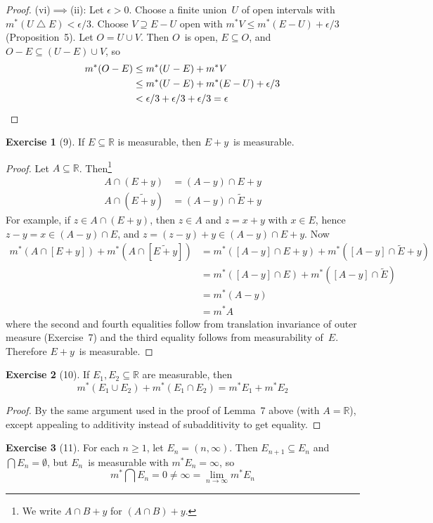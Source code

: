 \documentclass[letterpaper,12pt]{article}
\newcommand{\R}{\mathbb{R}}
\newcommand{\union}{\cup}
\newcommand{\sect}{\cap}
\newcommand{\diff}{\bigtriangleup}
\newcommand{\bigsect}{\bigcap}
\newcommand{\mo}{m^*}
\newcommand{\comp}[1]{\widetilde{#1}}
\theoremstyle{plain}
\theoremstyle{definition}
\newtheorem*{exer}{Exercise}
\theoremstyle{remark}
\begin{document}
\begin{proof}
(vi)\(\implies\)(ii): Let \(\epsilon>0\). Choose a finite union~\(U\) of open intervals with \(\mo(U\diff E)<\epsilon/3\). Choose \(V\supseteq E-U\) open with \(\mo V\le\mo(E-U)+\epsilon/3\) (Proposition~5). Let \(O=U\union V\). Then \(O\)~is open, \(E\subseteq O\), and \(O-E\subseteq(U-E)\union V\), so
\begin{align*}
\mo(O-E)&\le\mo(U-E)+\mo V\\
	&\le\mo(U-E)+\mo(E-U)+\epsilon/3\\
	&<\epsilon/3+\epsilon/3+\epsilon/3=\epsilon\qedhere
\end{align*}
\end{proof}

\begin{exer}[9]
If \(E\subseteq\R\) is measurable, then \(E+y\)~is measurable.
\end{exer}
\begin{proof}
Let \(A\subseteq\R\). Then\footnote{We write \(A\sect B+y\) for \((A\sect B)+y\).}
\begin{align*}
A\sect(E+y)&=(A-y)\sect E+y\\
A\sect(\comp{E+y})&=(A-y)\sect\comp{E}+y
\end{align*}
For example, if \(z\in A\sect(E+y)\), then \(z\in A\) and \(z=x+y\) with \(x\in E\), hence \(z-y=x\in(A-y)\sect E\), and \(z=(z-y)+y\in(A-y)\sect E+y\). Now
\begin{align*}
\mo(A\sect[E+y])+\mo(A\sect[\comp{E+y}])&=\mo([A-y]\sect E+y)+\mo([A-y]\sect\comp{E}+y)\\
	&=\mo([A-y]\sect E)+\mo([A-y]\sect\comp{E})\\
	&=\mo(A-y)\\
	&=\mo A
\end{align*}
where the second and fourth equalities follow from translation invariance of outer measure (Exercise~7) and the third equality follows from measurability of~\(E\). Therefore \(E+y\)~is measurable.
\end{proof}

\begin{exer}[10]
If \(E_1,E_2\subseteq\R\) are measurable, then
\[\mo(E_1\union E_2)+\mo(E_1\sect E_2)=\mo E_1+\mo E_2\]
\end{exer}
\begin{proof}
By the same argument used in the proof of Lemma~7 above (with \(A=\R\)), except appealing to additivity instead of subadditivity to get equality.
\end{proof}

\begin{exer}[11]
For each \(n\ge 1\), let \(E_n=(n,\infty)\). Then \(E_{n+1}\subseteq E_n\) and \(\bigsect E_n=\emptyset\), but \(E_n\)~is measurable with \(\mo E_n=\infty\), so
\[\mo\bigsect E_n=0\ne\infty=\lim_{n\to\infty}\mo E_n\]
\end{exer}
\end{document}
